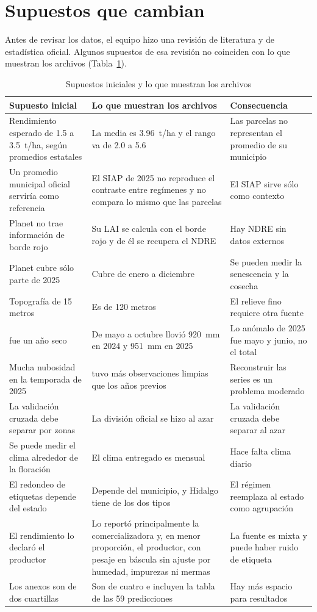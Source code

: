 \section{Supuestos que cambian}\label{sec:supuestos}
Antes de revisar los datos, el equipo hizo una revisión de literatura y de estadística oficial. Algunos supuestos de
esa revisión no coinciden con lo que muestran los archivos (Tabla~\ref{tab:supuestos}).

\begin{table}[!t]
\caption{Supuestos iniciales y lo que muestran los archivos}\label{tab:supuestos}
\centering\footnotesize
\begin{tabularx}{\textwidth}{@{}>{\raggedright\arraybackslash}p{4.6cm}>{\raggedright\arraybackslash}X>{\raggedright\arraybackslash}p{5.2cm}@{}}
\toprule
Supuesto inicial & Lo que muestran los archivos & Consecuencia \\
\midrule
Rendimiento esperado de 1.5 a 3.5~t/ha, según promedios estatales & La media es 3.96~t/ha y el rango va de 2.0 a 5.6 &
  Las parcelas no representan el promedio de su municipio \\
Un promedio municipal oficial serviría como referencia & El SIAP de 2025 no reproduce el contraste entre regímenes y no compara lo mismo que las parcelas &
  El SIAP sirve sólo como contexto \\
Planet no trae información de borde rojo & Su LAI se calcula con el borde rojo y de él se recupera el NDRE &
  Hay NDRE sin datos externos \\
Planet cubre sólo parte de 2025 & Cubre de enero a diciembre & Se pueden medir la senescencia y la cosecha \\
Topografía de 15 metros & Es de 120 metros & El relieve fino requiere otra fuente \\
2024 fue un año seco & De mayo a octubre llovió 920~mm en 2024 y 951~mm en 2025 & Lo anómalo de 2025 fue mayo y junio, no el total \\
Mucha nubosidad en la temporada de 2025 & 2025 tuvo más observaciones limpias que los años previos &
  Reconstruir las series es un problema moderado \\
La validación cruzada debe separar por zonas & La división oficial se hizo al azar & La validación cruzada debe separar al azar \\
Se puede medir el clima alrededor de la floración & El clima entregado es mensual & Hace falta clima diario \\
El redondeo de etiquetas depende del estado & Depende del municipio, y Hidalgo tiene de los dos tipos &
  El régimen reemplaza al estado como agrupación \\
El rendimiento lo declaró el productor & Lo reportó principalmente la comercializadora y, en menor proporción, el productor, con pesaje en báscula sin ajuste por humedad, impurezas ni mermas~\cite{preguntas} &
  La fuente es mixta y puede haber ruido de etiqueta \\
Los anexos son de dos cuartillas & Son de cuatro e incluyen la tabla de las 59 predicciones~\cite{preguntas} &
  Hay más espacio para resultados \\
\bottomrule
\end{tabularx}
\end{table}
